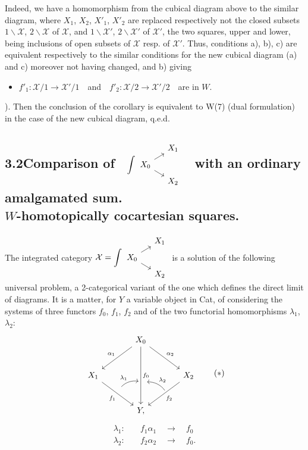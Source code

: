 \documentclass[11pt]{article}
\newcommand{\printedpage}[1]{\marginpar{\footnotesize p.~#1}}
\newcommand{\msp}[1]{\marginpar{\footnotesize [#1]}}
\newcommand{\cX}{\mathcal{X}}
\begin{document}
Indeed, we have a homomorphism from the cubical diagram above to the similar diagram, where $X_1$, $X_2$, $X'_1$, $X'_2$ are replaced respectively not the closed subsets %
$1\backslash\cX$, $2\backslash\cX$ of $\cX$, and $1\backslash\cX'$, $2\backslash\cX'$ of $\cX'$, the two squares, upper and lower, being inclusions of open subsets of $\cX$ resp. of $\cX'$. Thus, conditions a), b), c) are equivalent respectively to the similar conditions for the new cubical diagram
\msp{page 128}
(a) and c) moreover not having changed, and b) giving
\begin{itemize}
\item[b$'$)] $f'_1 : \cX/1 \longrightarrow \cX'/1$\ \ and\ \ $f'_2 : \cX/2 \longrightarrow \cX'/2$\ \ are in $W$.
\end{itemize}
). Then the conclusion of the corollary is equivalent to W(7) (dual formulation) in the case of the new cubical diagram, q.e.d.

\subsection*{3.2\quad Comparison of \ $\displaystyle\int
\begin{tikzcd}[column sep=small, row sep=tiny, ampersand replacement=\&, baseline=(\tikzcdmatrixname-2-1.base)]
 \& X_1 \\
X_0 \arrow[ur] \arrow[dr] \& \\
 \& X_2
\end{tikzcd}$ \ with an ordinary amalgamated sum.\\
$W$-homotopically cocartesian squares.}

The integrated category $\cX = \displaystyle\int
\begin{tikzcd}[column sep=small, row sep=tiny, ampersand replacement=\&, baseline=(\tikzcdmatrixname-2-1.base)]
 \& X_1 \\
X_0 \arrow[ur] \arrow[dr] \& \\
 \& X_2
\end{tikzcd}$ is a solution of the following universal problem, a 2-categorical variant of the one which defines the direct limit of diagrams. It is a matter, for $Y$ a variable object in Cat, of considering the systems of three functors $f_0$, $f_1$, $f_2$ and of the two functorial homomorphisms $\lambda_1$, $\lambda_2$:
\printedpage{87}
\[
\begin{tikzcd}[column sep=large, row sep=large, ampersand replacement=\&]
 \& X_0 \arrow[dl, "\alpha_1"'] \arrow[dr, "\alpha_2"] \arrow[dd, "f_0", ""{name=M, pos=0.62}] \& \\
X_1 \arrow[dr, "f_1"', ""{name=A, pos=0.45}] \& \& X_2 \arrow[dl, "f_2", ""{name=B, pos=0.45}] \\
 \& Y, \&
\arrow[from=A, to=M, bend left, shorten=3pt, "\lambda_1"]
\arrow[from=B, to=M, bend right, shorten=3pt, "\lambda_2"']
\end{tikzcd}
\tag*{$(*)$}
\]
\[
\begin{aligned}
\lambda_1 :\quad & f_1\alpha_1 \quad\longrightarrow\quad f_0\\
\lambda_2 :\quad & f_2\alpha_2 \quad\longrightarrow\quad f_0.
\end{aligned}
\]
\end{document}

